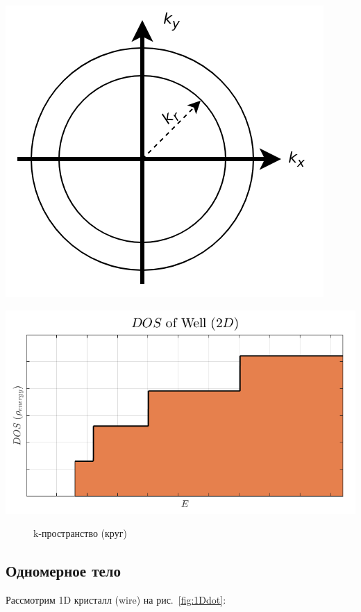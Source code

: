 \noindent
\begin{minipage}[b]{0.35\textwidth}
	\centering
    \includegraphics[width=\textwidth]{assets/2DWire}
\end{minipage}
\hfill
\begin{minipage}[b]{0.6\textwidth}
	\centering
	\includegraphics[width=\textwidth]{assets/gE2D}
\end{minipage}

\begin{figure}[h]
	\centering
	\caption{k-пространство (круг)}
	\label{fig:2DWire}
\end{figure}

\subsection{Одномерное тело}
Рассмотрим 1D кристалл (wire)  на рис.~\ref{fig:1Ddot}:

